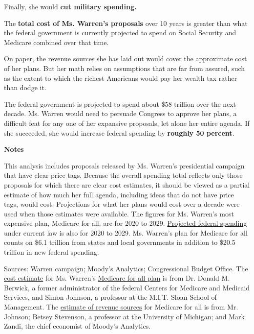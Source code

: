 Finally, she would \textbf{cut military spending.}

The \textbf{total cost of Ms. Warren's proposals} over 10 years is
greater than what the federal government is currently projected to spend
on Social Security and Medicare combined over that time.

On paper, the revenue sources she has laid out would cover the
approximate cost of her plans. But her math relies on assumptions that
are far from assured, such as the extent to which the richest Americans
would pay her wealth tax rather than dodge it.

The federal government is projected to spend about \$58 trillion over
the next decade. Ms. Warren would need to persuade Congress to approve
her plans, a difficult feat for any one of her expansive proposals, let
alone her entire agenda. If she succeeded, she would increase federal
spending by \textbf{roughly 50 percent}.

\textbf{Notes}

This analysis includes proposals released by Ms. Warren's presidential
campaign that have clear price tags. Because the overall spending total
reflects only those proposals for which there are clear cost estimates,
it should be viewed as a partial estimate of how much her full agenda,
including ideas that do not have price tags, would cost. Projections for
what her plans would cost over a decade were used when those estimates
were available. The figures for Ms. Warren's most expensive plan,
Medicare for all, are for 2020 to 2029.
\href{https://www.cbo.gov/system/files/2019-08/55551-CBO-outlook-update_0.pdf\#page=11}{Projected
federal spending} under current law is also for 2020 to 2029. Ms.
Warren's plan for Medicare for all counts on \$6.1 trillion from states
and local governments in addition to \$20.5 trillion in new federal
spending.

Sources: Warren campaign; Moody's Analytics; Congressional Budget
Office. The
\href{https://int.nyt.com/data/documenthelper/6423-cost-estimate-for-warren-medicare-for-all/aea6a2d073e99921e256/optimized/full.pdf\#page=1}{cost
estimate} for Ms. Warren's
\href{https://medium.com/@teamwarren/ending-the-stranglehold-of-health-care-costs-on-american-families-bf8286b13086}{Medicare
for all plan} is from Dr. Donald M. Berwick, a former administrator of
the federal Centers for Medicare and Medicaid Services, and Simon
Johnson, a professor at the M.I.T. Sloan School of Management. The
\href{https://int.nyt.com/data/documenthelper/6424-revenue-estimate-for-warren-medicare-for-all/aea6a2d073e99921e256/optimized/full.pdf\#page=1}{estimate
of revenue sources} for Medicare for all is from Mr. Johnson; Betsey
Stevenson, a professor at the University of Michigan; and Mark Zandi,
the chief economist of Moody's Analytics.

